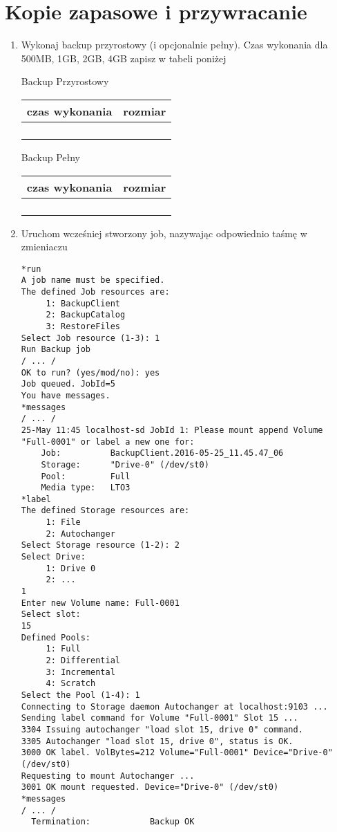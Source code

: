 \documentclass[polish]{article}
\begin{document}
\section*{Kopie zapasowe i przywracanie}

\begin{enumerate}

\item Wykonaj backup przyrostowy (i opcjonalnie pełny). Czas wykonania dla 500MB, 1GB, 2GB, 4GB zapisz w tabeli poniżej

Backup Przyrostowy

\begin{tabular}{|c|c|}
  \hline 
  czas wykonania & rozmiar \\
  \hline
  & \\
  \hline
  & \\
  \hline
  & \\
  \hline
  & \\
  \hline
\end{tabular} 

Backup Pełny

\begin{tabular}{|c|c|}
  \hline 
  czas wykonania & rozmiar \\
  \hline
  & \\
  \hline
  & \\
  \hline
  & \\
  \hline
  & \\
  \hline
\end{tabular} 

\item Uruchom wcześniej stworzony job, nazywając odpowiednio taśmę w zmieniaczu
\begin{verbatim}
*run
A job name must be specified.
The defined Job resources are:
     1: BackupClient
     2: BackupCatalog
     3: RestoreFiles
Select Job resource (1-3): 1
Run Backup job
/ ... /
OK to run? (yes/mod/no): yes
Job queued. JobId=5
You have messages.
*messages
/ ... /
25-May 11:45 localhost-sd JobId 1: Please mount append Volume "Full-0001" or label a new one for:
    Job:          BackupClient.2016-05-25_11.45.47_06
    Storage:      "Drive-0" (/dev/st0)
    Pool:         Full
    Media type:   LTO3
*label
The defined Storage resources are:
     1: File
     2: Autochanger
Select Storage resource (1-2): 2
Select Drive:
     1: Drive 0
     2: ...
1
Enter new Volume name: Full-0001
Select slot:
15
Defined Pools:
     1: Full
     2: Differential
     3: Incremental
     4: Scratch
Select the Pool (1-4): 1
Connecting to Storage daemon Autochanger at localhost:9103 ...
Sending label command for Volume "Full-0001" Slot 15 ...
3304 Issuing autochanger "load slot 15, drive 0" command.
3305 Autochanger "load slot 15, drive 0", status is OK.
3000 OK label. VolBytes=212 Volume="Full-0001" Device="Drive-0" (/dev/st0)
Requesting to mount Autochanger ...
3001 OK mount requested. Device="Drive-0" (/dev/st0)
*messages
/ ... /
  Termination:            Backup OK
\end{verbatim}


\end{enumerate}
\end{document}
